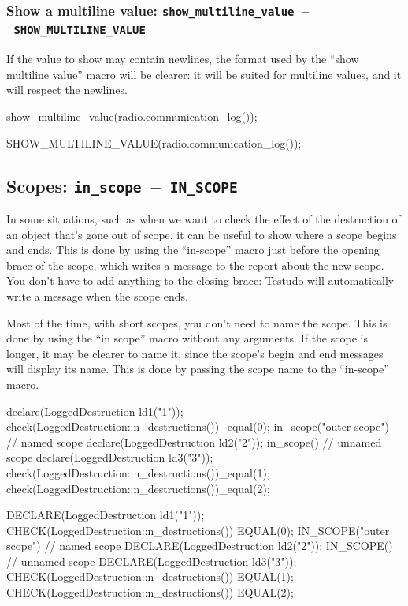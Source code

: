 \documentclass[twoside, a4paper, article]{memoir}
\newcommand*\testudocolor{\color{red!80!blue}}
\newcommand*\testudo[1]{\texttt{\testudocolor{}#1}}
\newcommand*\testudopair[2]{\testudo{#1}~--~\testudo{#2}}
\newcommand\subsectiontestudopair[3]{%
  \subsection[#1]{#1: \testudopair{#2}{#3}}}
\newcommand\subsubsectiontestudopair[3]{%
  \subsubsection[#1]{#1: \testudopair{#2}{#3}}}
\begin{document}
\subsubsectiontestudopair{Show a multiline value}
  {show\_multiline\_value}{SHOW\_MULTILINE\_VALUE}
\label{sec:show-multiline-value}

If the value to show may contain newlines, the format used by the ``show
multiline value'' macro will be clearer: it will be suited for multiline
values, and it will respect the newlines.

\begin{cpplisting}
show_multiline_value(radio.communication_log());
\end{cpplisting}

\begin{cpplisting}
SHOW_MULTILINE_VALUE(radio.communication_log());
\end{cpplisting}

\subsectiontestudopair{Scopes}{in\_scope}{IN\_SCOPE}
\label{sec:scopes}

In some situations, such as when we want to check the effect of the destruction
of an object that's gone out of scope, it can be useful to show where a scope
begins and ends.  This is done by using the ``in-scope'' macro just before the
opening brace of the scope, which writes a message to the report about the new
scope.  You don't have to add anything to the closing brace: Testudo will
automatically write a message when the scope ends.

Most of the time, with short scopes, you don't need to name the scope.  This is
done by using the ``in scope'' macro without any arguments.  If the scope is
longer, it may be clearer to name it, since the scope's begin and end messages
will display its name.  This is done by passing the scope name to the
``in-scope'' macro.

\begin{cpplisting}
declare(LoggedDestruction ld1("1"));
check(LoggedDestruction::n_destructions())_equal(0);
in_scope("outer scope") { // named scope
  declare(LoggedDestruction ld2("2"));
  in_scope() { // unnamed scope
    declare(LoggedDestruction ld3("3"));
  }
  check(LoggedDestruction::n_destructions())_equal(1);
}
check(LoggedDestruction::n_destructions())_equal(2);
\end{cpplisting}

\begin{cpplisting}
DECLARE(LoggedDestruction ld1("1"));
CHECK(LoggedDestruction::n_destructions()) EQUAL(0);
IN_SCOPE("outer scope") // named scope
{
  DECLARE(LoggedDestruction ld2("2"));
  IN_SCOPE() // unnamed scope
  {
    DECLARE(LoggedDestruction ld3("3"));
  }
  CHECK(LoggedDestruction::n_destructions()) EQUAL(1);
}
CHECK(LoggedDestruction::n_destructions()) EQUAL(2);
\end{cpplisting}
\end{document}
